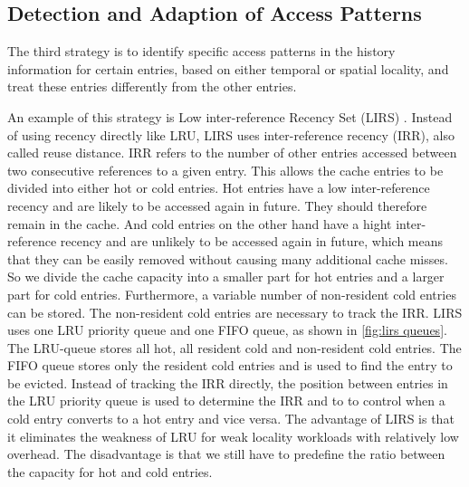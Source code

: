 \documentclass[
	12pt,
	a4paper,
	abstract,
	bibliography=totoc,
	chapterprefix,
	headings=openright,
	numbers=endperiod,
	parskip=half,
	twoside,
]{scrreprt}
\begin{document}
\subsection{Detection and Adaption of Access Patterns}

The third strategy is to identify specific access patterns in the history information for certain entries, based on either temporal or spatial locality, and treat these entries differently from the other entries.

An example of this strategy is Low inter-reference Recency Set (LIRS) \cite{10.1145/511399.511340}.
Instead of using recency directly like LRU, LIRS uses inter-reference recency (IRR), also called reuse distance.
IRR refers to the number of other entries accessed between two consecutive references to a given entry.
This allows the cache entries to be divided into either hot or cold entries.
Hot entries have a low inter-reference recency and are likely to be accessed again in future.
They should therefore remain in the cache.
And cold entries on the other hand have a hight inter-reference recency and are unlikely to be accessed again in future, which means that they can be easily removed without causing many additional cache misses.
So we divide the cache capacity into a smaller part for hot entries and a larger part for cold entries.
Furthermore, a variable number of non-resident cold entries can be stored.
The non-resident cold entries are necessary to track the IRR.
LIRS uses one LRU priority queue and one FIFO queue, as shown in \ref{fig:lirs queues}.
The LRU-queue stores all hot, all resident cold and non-resident cold entries.
The FIFO queue stores only the resident cold entries and is used to find the entry to be evicted.
Instead of tracking the IRR directly, the position between entries in the LRU priority queue is used to determine the IRR and to 
to control when a cold entry converts to a hot entry and vice versa.
The advantage of LIRS is that it eliminates the weakness of LRU for weak locality workloads with relatively low overhead.
The disadvantage is that we still have to predefine the ratio between the capacity for hot and cold entries.
\end{document}

